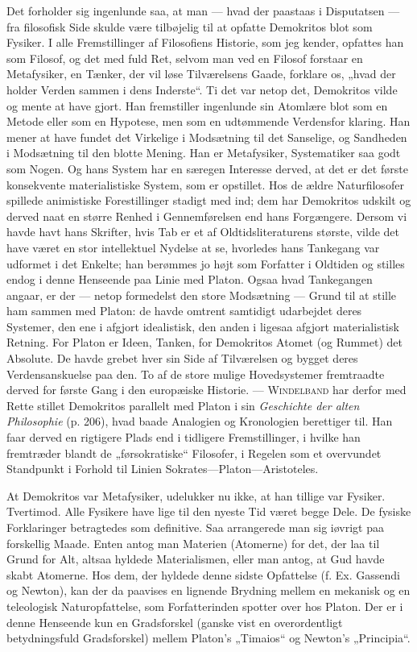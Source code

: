 \documentclass[12pt,a4paper,openany]{book}
\newcommand{\opage}[1]{\marginnote{\footnotesize\textit{[#1]}}}
\begin{document}
Det forholder sig ingenlunde saa, at man --- hvad der paastaas
i Disputatsen --- fra filosofisk Side skulde være tilbøjelig
til at opfatte Demokritos blot som Fysiker. I alle Fremstillinger
af Filosofiens Historie, som jeg kender, opfattes han som Filosof,
og det med fuld Ret, selvom man ved en Filosof forstaar en
Metafysiker, en Tænker, der vil løse Tilværelsens Gaade, forklare
os, „hvad der holder Verden sammen i dens Inderste“.
Ti det var netop det, Demokritos vilde og mente at have gjort.
Han fremstiller ingenlunde sin Atomlære blot som en Metode
eller som en Hypotese, men som en udtømmende Verdensfor%
\setcounter{footnote}{0}%
\opage{95}klaring. Han mener at have fundet det Virkelige i Modsætning
til det Sanselige, og Sandheden i Modsætning til den blotte
Mening. Han er Metafysiker, Systematiker saa godt som Nogen.
Og hans System har en særegen Interesse derved, at det er
det første konsekvente materialistiske System, som er opstillet.
Hos de ældre Naturfilosofer spillede animistiske Forestillinger
stadigt med ind; dem har Demokritos udskilt og derved naat
en større Renhed i Gennemførelsen end hans Forgængere. Dersom
vi havde havt hans Skrifter, hvis Tab er et af Oldtidsliteraturens
største, vilde det have været en stor intellektuel Nydelse
at se, hvorledes hans Tankegang var udformet i det
Enkelte; han berømmes jo højt som Forfatter i Oldtiden og
stilles endog i denne Henseende paa Linie med Platon. Ogsaa
hvad Tankegangen angaar, er der --- netop formedelst den store
Modsætning --- Grund til at stille ham sammen med Platon:
de havde omtrent samtidigt udarbejdet deres Systemer, den ene
i afgjort idealistisk, den anden i ligesaa afgjort materialistisk
Retning. For Platon er Ideen, Tanken, for Demokritos Atomet
(og Rummet) det Absolute. De havde grebet hver sin Side af
Tilværelsen og bygget deres Verdensanskuelse paa den. To af
de store mulige Hovedsystemer fremtraadte derved for første
Gang i den europæiske Historie. --- \textsc{Windelband} har derfor
med Rette stillet Demokritos parallelt med Platon i sin \textit{Geschichte
der alten Philosophie} (p. 206), hvad baade Analogien og Kronologien
berettiger til. Han faar derved en rigtigere Plads end
i tidligere Fremstillinger, i hvilke han fremtræder blandt de „førsokratiske“
Filosofer, i Regelen som et overvundet Standpunkt i
Forhold til Linien Sokrates---Platon---Aristoteles.

At Demokritos var Metafysiker, udelukker nu ikke, at han
tillige var Fysiker. Tvertimod. Alle Fysikere have lige til den
nyeste Tid været begge Dele. De fysiske Forklaringer betragtedes
som definitive. Saa arrangerede man sig iøvrigt paa forskellig
Maade. Enten antog man Materien (Atomerne) for det,
der laa til Grund for Alt, altsaa hyldede Materialismen, eller
man antog, at Gud havde skabt Atomerne. Hos dem, der hyldede
denne sidste Opfattelse (f. Ex. Gassendi og Newton), kan
der da paavises en lignende Brydning mellem en mekanisk og
\setcounter{footnote}{0}%
\opage{96}en teleologisk Naturopfattelse, som Forfatterinden spotter over
hos Platon. Der er i denne Henseende kun en Gradsforskel
(ganske vist en overordentligt betydningsfuld Gradsforskel) mellem
Platon’s „Timaios“ og Newton’s „Principia“.
\end{document}
